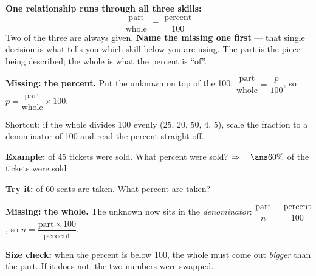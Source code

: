 \documentclass[12pt]{article}
\begin{document}

\begin{formulabox}
\textbf{One relationship runs through all three skills:}
\[ \frac{\text{part}}{\text{whole}} \;=\; \frac{\text{percent}}{100} \]
Two of the three are always given. \textbf{Name the missing one first} --- that single
decision is what tells you which skill below you are using. The part is the piece being
described; the whole is what the percent is ``of''.
\end{formulabox}


\begin{formulabox}
\textbf{Missing: the percent.} Put the unknown on top of the 100:
$\dfrac{\text{part}}{\text{whole}} = \dfrac{p}{100}$, so $p = \dfrac{\text{part}}{\text{whole}} \times 100$.\par
Shortcut: if the whole divides 100 evenly (25, 20, 50, 4, 5), scale the fraction to a
denominator of 100 and read the percent straight off.
\end{formulabox}

\begin{examplebox}
\textbf{Example:}  of 45 tickets were sold. What percent were sold?
$\Rightarrow\quad \ans{60\%}$ of the tickets were sold
\end{examplebox}

\begin{tryitbox}
\textbf{Try it:}  of 60 seats are taken. What percent are taken?\\[2pt]
\end{tryitbox}


\begin{formulabox}
\textbf{Missing: the whole.} The unknown now sits in the \emph{denominator}:
$\dfrac{\text{part}}{n} = \dfrac{\text{percent}}{100}$, so $n = \dfrac{\text{part} \times 100}{\text{percent}}$.\par
\textbf{Size check:} when the percent is below 100, the whole must come out
\emph{bigger} than the part. If it does not, the two numbers were swapped.
\end{formulabox}
\end{document}
